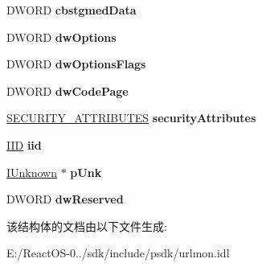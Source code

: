 \begin{DoxyCompactItemize}
D\+W\+O\+RD {\bfseries cbstgmed\+Data}
\item 
\mbox{\label{struct_i_bind_status_callback_1_1__tag_b_i_n_d_i_n_f_o_a2ea20ee83227d0f757709b25362cc01b}} 
D\+W\+O\+RD {\bfseries dw\+Options}
\item 
\mbox{\label{struct_i_bind_status_callback_1_1__tag_b_i_n_d_i_n_f_o_ac5ffa7574e6d4296c490dbb73e811eee}} 
D\+W\+O\+RD {\bfseries dw\+Options\+Flags}
\item 
\mbox{\label{struct_i_bind_status_callback_1_1__tag_b_i_n_d_i_n_f_o_a153103baa53066cf8ccd0a004093aa62}} 
D\+W\+O\+RD {\bfseries dw\+Code\+Page}
\item 
\mbox{\label{struct_i_bind_status_callback_1_1__tag_b_i_n_d_i_n_f_o_aab13de12da51b2090e3bdb2837fb4dc2}} 
\hyperlink{struct___s_e_c_u_r_i_t_y___a_t_t_r_i_b_u_t_e_s}{S\+E\+C\+U\+R\+I\+T\+Y\+\_\+\+A\+T\+T\+R\+I\+B\+U\+T\+ES} {\bfseries security\+Attributes}
\item 
\mbox{\label{struct_i_bind_status_callback_1_1__tag_b_i_n_d_i_n_f_o_a975e039d4a5e8610e73084533ca32ce5}} 
\hyperlink{struct___i_i_d}{I\+ID} {\bfseries iid}
\item 
\mbox{\label{struct_i_bind_status_callback_1_1__tag_b_i_n_d_i_n_f_o_ad823c3f6a58b136daae065ef131e5970}} 
\hyperlink{interface_i_unknown}{I\+Unknown} $\ast$ {\bfseries p\+Unk}
\item 
\mbox{\label{struct_i_bind_status_callback_1_1__tag_b_i_n_d_i_n_f_o_aca354f2d25977ac62f599f7cb53573a5}} 
D\+W\+O\+RD {\bfseries dw\+Reserved}
\end{DoxyCompactItemize}


该结构体的文档由以下文件生成\+:\begin{DoxyCompactItemize}
\item 
E\+:/\+React\+O\+S-\/0../sdk/include/psdk/urlmon.\+idl\end{DoxyCompactItemize}
